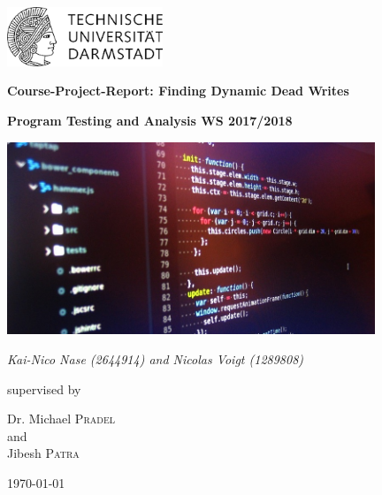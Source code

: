 \documentclass[a4paper]{scrartcl}
\begin{document}
 

\begin{titlepage}
	\centering
	\includegraphics[width=0.35\textwidth]{TULOGO.png}\par\vspace{1cm}
	{\scshape\Large \par}
	\vspace{1.5cm}
	{\LARGE\bfseries Course-Project-Report: Finding Dynamic Dead Writes\par}
	{\large\bfseries Program Testing and Analysis WS 2017/2018\par}
	\vspace{2cm}
	\begin{center}
	\includegraphics[width = 110mm]{Titlepage.jpg}
	\end{center}
	{\Large\itshape Kai-Nico Nase (2644914) and Nicolas Voigt (1289808)\par}
	\vfill
	supervised by\par
	Dr. Michael \textsc{Pradel}\\
	and\\
	Jibesh \textsc{Patra}	
    
	\vfill
	{\large \today\par}
\end{titlepage}

\newpage
\tableofcontents
\listoffigures%
\newpage
{}
\end{document}
